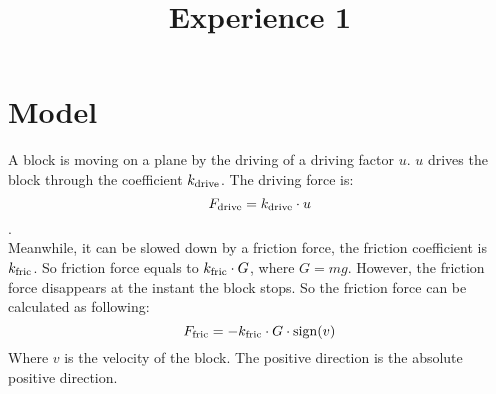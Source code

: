 \documentclass {article}
\title {Experience 1}
\begin{document}
        \section{Model}
            A block is moving on a plane by the driving of a driving factor $u$. $u$ drives the block through the coefficient $k_{\rm drive}$. The driving force is:\\
            \[F_{\rm drive} = k_{\rm drive}\cdot u\].\\
            Meanwhile, it can be slowed down by a friction force, the friction coefficient is $k_{\rm fric}$. So friction force equals to $k_{\rm fric}\cdot G$, where $G = mg$. However, the friction force disappears at the instant the block stops. So the friction force can be calculated as following:
            \[F_{\rm fric} = - k_{\rm fric}\cdot G\cdot {\rm sign}(v)\]
            Where $v$ is the velocity of the block. The positive direction is the absolute positive direction.
    
\end{document}
